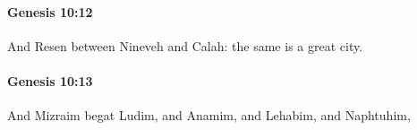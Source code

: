 		\paragraph{Genesis 10:12} %
			\label{GENESIS-10-12}

			And Resen between Nineveh and Calah: the same is a great city.


		\paragraph{Genesis 10:13} %
			\label{GENESIS-10-13}

			And Mizraim begat Ludim, and Anamim, and Lehabim, and Naphtuhim,



